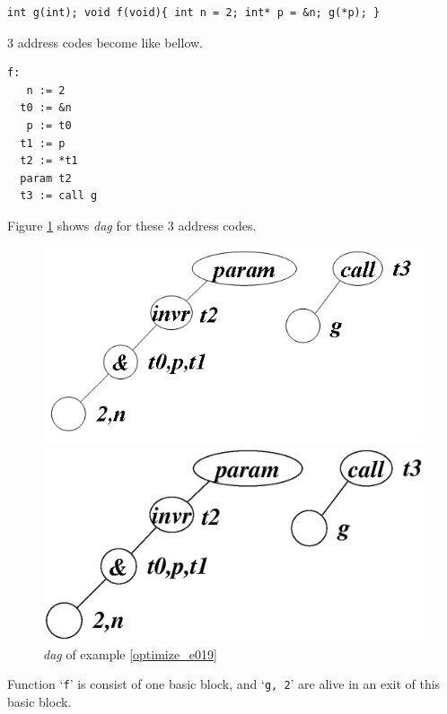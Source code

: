 \begin{Example}
\label{optimize_e019}
\begin{verbatim}
int g(int); void f(void){ int n = 2; int* p = &n; g(*p); }
\end{verbatim}
3 address codes become like bellow.
\begin{verbatim}
f:
   n := 2
  t0 := &n
   p := t0
  t1 := p
  t2 := *t1
  param t2
  t3 := call g
\end{verbatim}
Figure \ref{optimize_e020} shows {\em dag} for these 3 address codes.
\begin{figure}[htbp]
\begin{center}
\begin{htmlonly}
\includegraphics[width=1.0\linewidth,height=0.507\linewidth]{opt008.png}
\end{htmlonly}
\begin{latexonly}
\includegraphics[width=1.0\linewidth,height=0.507\linewidth]{opt008.eps}
\end{latexonly}
\caption{{\em dag} of example \ref{optimize_e019}}
\label{optimize_e020}
\end{center}
\end{figure}
Function `{\tt{f}}' is consist of one basic block, and 
`{\tt{g, 2}}' are alive in an exit of this basic block.

\end{Example}
